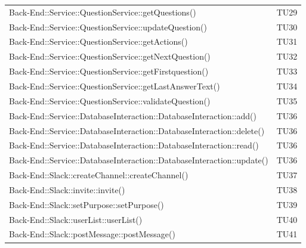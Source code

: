 \documentclass[../PianoDiQualifica_v3.0.0.tex]{subfiles}
\begin{document}
\begin{longtable}[c] {>{\centering\arraybackslash}p{} >{\centering\arraybackslash}p{}}
			\midrule
			\addlinespace[0.3em]
 			Back-End::Service::QuestionService::getQuestions() & TU29 \\
 			\addlinespace[0.3em]
			\midrule
			\addlinespace[0.3em]
 			Back-End::Service::QuestionService::updateQuestion() & TU30 \\
 			\addlinespace[0.3em]
			\midrule
			\addlinespace[0.3em]
 			Back-End::Service::QuestionService::getActions() & TU31 \\
 			\addlinespace[0.3em]
			\midrule
			\addlinespace[0.3em]
			Back-End::Service::QuestionService::getNextQuestion() & TU32 \\
 			\addlinespace[0.3em]
			\midrule
			\addlinespace[0.3em]
 			Back-End::Service::QuestionService::getFirstquestion() & TU33 \\
 			\addlinespace[0.3em]
			\midrule
			\addlinespace[0.3em]
 			Back-End::Service::QuestionService::getLastAnswerText() & TU34\\
 			\addlinespace[0.3em]
			\midrule
			\addlinespace[0.3em]
			Back-End::Service::QuestionService::validateQuestion() & TU35 \\
 			\addlinespace[0.3em]
			\midrule
			\addlinespace[0.3em]
 			Back-End::Service::DatabaseInteraction::DatabaseInteraction::add() & TU36 \\
 			\addlinespace[0.3em]
			\midrule
			\addlinespace[0.3em]
			Back-End::Service::DatabaseInteraction::DatabaseInteraction::delete() & TU36 \\
 			\addlinespace[0.3em]
			\midrule
			\addlinespace[0.3em]
 			Back-End::Service::DatabaseInteraction::DatabaseInteraction::read() & TU36 \\
 			\addlinespace[0.3em]
			\midrule
			\addlinespace[0.3em]
 			Back-End::Service::DatabaseInteraction::DatabaseInteraction::update() & TU36 \\
			\addlinespace[0.3em]
			\midrule
			\addlinespace[0.3em]
 			Back-End::Slack::createChannel::createChannel() & TU37 \\
 			\addlinespace[0.3em]
			\midrule
			\addlinespace[0.3em]
 			Back-End::Slack::invite::invite() & TU38 \\
 			\addlinespace[0.3em]
			\midrule
			\addlinespace[0.3em]
 			Back-End::Slack::setPurpose::setPurpose() & TU39 \\
			\addlinespace[0.3em]
			\midrule
			\addlinespace[0.3em]
 			Back-End::Slack::userList::userList() & TU40 \\
 			\addlinespace[0.3em]
			\midrule
			\addlinespace[0.3em]
			Back-End::Slack::postMessage::postMessage() & TU41 \\

\end{longtable}
\end{document}
